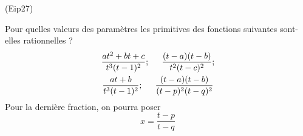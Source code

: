 \begin{tiny}(Eip27)\end{tiny} Pour quelles valeurs des paramètres les primitives des fonctions suivantes sont-elles rationnelles ?
\begin{multline*}
 \frac{at^2+bt+c}{t^3(t-1)^2}; \hspace{0.5cm}\frac{(t-a)(t-b)}{t^2(t-c)^2}; \\
\frac{at+b}{t^3(t-1)^2};\hspace{0.5cm}\frac{(t-a)(t-b)}{(t-p)^2(t-q)^2}
\end{multline*}
Pour la dernière fraction, on pourra poser
\begin{displaymath}
 x=\frac{t-p}{t-q}
\end{displaymath}
